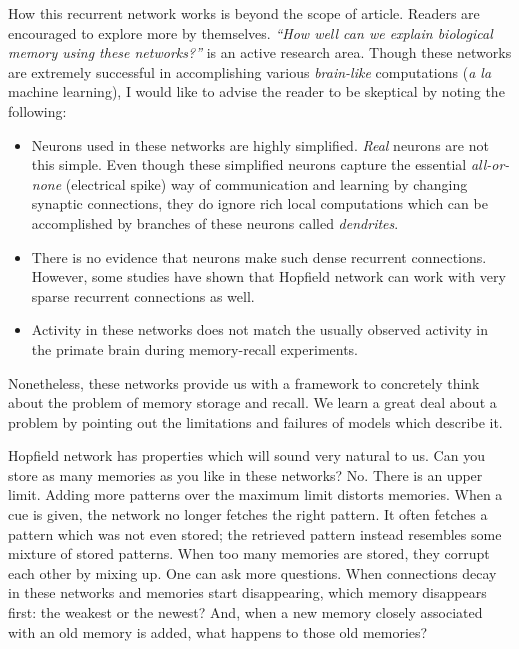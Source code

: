 \documentclass[]{resonance}
\begin{document}
How this recurrent network works is beyond the scope of article. Readers are
encouraged to explore more by themselves. \emph{``How well can we explain
biological memory using these networks?''} is an active research area.  Though
these networks are extremely successful in accomplishing various
\textit{brain-like} computations (\textit{a la} machine learning), I would like
to advise the reader to be skeptical by noting the following:

\begin{itemize}
    \item  Neurons used in these networks are highly simplified. \textit{Real}
        neurons are not this simple. Even though these simplified neurons
        capture the essential \textit{all-or-none} (electrical spike) way of
        communication and learning by changing synaptic connections, they do
        ignore rich local computations which can be accomplished by branches of
        these neurons called \textit{dendrites}.
    \item  There is no evidence that neurons make such dense recurrent
        connections. However, some studies have shown that Hopfield network can
        work with very sparse recurrent connections as well.
    \item Activity in these networks does not match the usually observed activity 
        in the primate brain during memory-recall experiments.
\end{itemize}


Nonetheless, these networks provide us with a framework to concretely think
about the problem of memory storage and recall. We learn a great deal about a
problem by pointing out the limitations and failures of models which describe it. 

Hopfield network has properties which will sound very natural to us. Can you
store as many memories as you like in these networks? No. There is an upper
limit. Adding more patterns over the maximum limit distorts memories.  When a
cue is given, the network no longer fetches the right pattern. It often fetches
a pattern which was not even stored; the retrieved pattern instead resembles
some mixture of stored patterns. When too many memories are stored, they corrupt
each other by mixing up. One can ask more questions. When connections decay in
these networks and memories start disappearing, which memory disappears first:
the weakest or the newest? And, when a new memory closely associated with an old
memory is added, what happens to those old memories?
\end{document}
